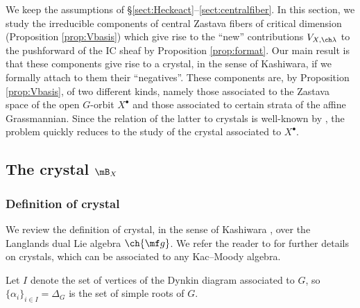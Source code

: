 \documentclass[final]{amsart}
\theoremstyle{remark}
\theoremstyle{definition}
\numberwithin{equation}{section}
\begin{document}
We keep the assumptions of \S\ref{sect:Heckeact}--\ref{sect:centralfiber}. In this section, we study the irreducible components of central Zastava fibers of critical dimension (Proposition \ref{prop:Vbasis}) which give rise to the ``new'' contributions $V_{X,\ch\lambda}$ to the pushforward of the IC sheaf by Proposition \ref{prop:format}. Our main result is that these components give rise to a crystal, in the sense of Kashiwara, if we formally attach to them their ``negatives''. These components are, by Proposition \ref{prop:Vbasis}, of two different kinds, namely those associated to the Zastava space of the open $G$-orbit $X^\bullet$ and those associated to certain strata of the affine Grassmannian. Since the relation of the latter to crystals is well-known by 
\cite{BGcrys, BFG}, the problem quickly reduces to the study of the crystal associated to $X^\bullet$. 



\subsection{The crystal $\mB_{X}$} 

\subsubsection{Definition of crystal} 
We review the definition of crystal, in the sense of Kashiwara \cite{Kas93}, 
over the Langlands dual Lie algebra $\ch{\mf g}$. We refer the reader to 
\cite{Kas94, Kas95, BS, HK} for further details on crystals, which can be associated 
to any Kac--Moody algebra. 

Let $I$ denote the set of vertices of the Dynkin diagram associated to $G$, 
so $\{\alpha_i\}_{i\in I} = \Delta_G$ is the set of simple roots of $G$. 
\end{document}
